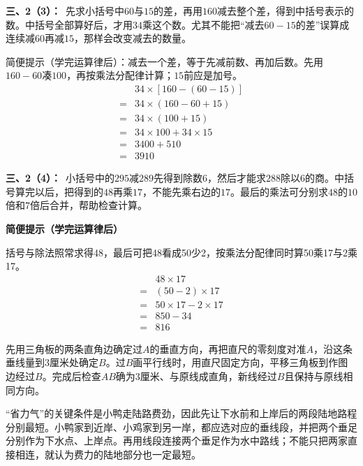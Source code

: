 \documentclass[multi=snippet,border=0pt]{standalone}
\newenvironment{snippet}[3]{\begin{minipage}{#1bp}\color{answerred}\fontsize{#2}{#3}\selectfont\raggedright}{\end{minipage}}
\begin{document}
\begin{snippet}{505}{11.5}{14}\textbf{三、2（3）：}\ 先求小括号中\(60\)与\(15\)的差，再用\(160\)减去整个差，得到中括号表示的数。中括号全部算好后，才用\(34\)乘这个数。尤其不能把“减去\(60-15\)的差”误算成连续减\(60\)再减\(15\)，那样会改变减去的数量。\par 简便提示（学完运算律后）：减去一个差，等于先减前数、再加后数。先用\(160-60\)凑\(100\)，再按乘法分配律计算；\(15\)前应是加号。\[\begin{aligned}&34\times[160-(60-15)]\\={}&34\times(160-60+15)\\={}&34\times(100+15)\\={}&34\times100+34\times15\\={}&3400+510\\={}&3910\end{aligned}\]\end{snippet}
\begin{snippet}{505}{11.5}{14}\textbf{三、2（4）：}\ 小括号中的\(295\)减\(289\)先得到除数\(6\)，然后才能求\(288\)除以\(6\)的商。中括号算完以后，把得到的\(48\)再乘\(17\)，不能先乘右边的\(17\)。最后的乘法可分别求\(48\)的\(10\)倍和\(7\)倍后合并，帮助检查计算。\par\textbf{简便提示（学完运算律后）}\par 括号与除法照常求得48，最后可把48看成50少2，按乘法分配律同时算50乘17与2乘17。\[\begin{aligned}&48\times17\\={}&(50-2)\times17\\={}&50\times17-2\times17\\={}&850-34\\={}&816\end{aligned}\]\end{snippet}
\begin{snippet}{505}{11.5}{14}先用三角板的两条直角边确定过\(A\)的垂直方向，再把直尺的零刻度对准\(A\)，沿这条垂线量到\(3\)厘米处确定\(B\)。过\(B\)画平行线时，用直尺固定方向，平移三角板到作图边经过\(B\)。完成后检查\(AB\)确为\(3\)厘米、与原线成直角，新线经过\(B\)且保持与原线相同方向。\end{snippet}
\begin{snippet}{505}{11.5}{14}“省力气”的关键条件是小鸭走陆路费劲，因此先让下水前和上岸后的两段陆地路程分别最短。小鸭家到近岸、小鸡家到另一岸，都应选对应的垂线段，并把两个垂足分别作为下水点、上岸点。再用线段连接两个垂足作为水中路线；不能只把两家直接相连，就认为费力的陆地部分也一定最短。\end{snippet}
\end{document}
